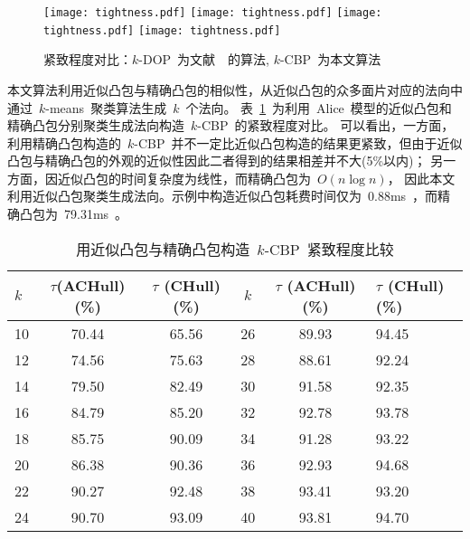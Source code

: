 \begin{figure}[htbp] 
\centering
{}
{
    \texttt{[image: tightness.pdf]}
}
{  
   \texttt{[image: tightness.pdf]}
}
\linebreak
{}
{  
    \texttt{[image: tightness.pdf]}
}
{  
   \texttt{[image: tightness.pdf]}
}
\caption{紧致程度对比：$k$-DOP~为文献~~的算法, $k$-CBP~为本文算法}
\label{chart:exps:tightness}
\end{figure}

本文算法利用近似凸包与精确凸包的相似性，从近似凸包的众多面片对应的法向中通过~$k$-means~聚类算法生成~$k$~个法向。
表~\ref{tab:exp:ach:ch:tightness}~为利用~Alice~模型的近似凸包和精确凸包分别聚类生成法向构造~$k$-CBP~的紧致程度对比。
可以看出，一方面，利用精确凸包构造的~$k$-CBP~并不一定比近似凸包构造的结果更紧致，但由于近似凸包与精确凸包的外观的近似性因此二者得到的结果相差并不大(5\%以内)；
另一方面，因近似凸包的时间复杂度为线性，而精确凸包为~$O(n\log n)$，
因此本文利用近似凸包聚类生成法向。示例中构造近似凸包耗费时间仅为~0.88ms~，而精确凸包为~79.31ms~。

\begin{table}[htbp]   
\centering
\caption{用近似凸包与精确凸包构造~$k$-CBP~紧致程度比较}
\label{tab:exp:ach:ch:tightness}
\begin{tabular}{lccccl}
\toprule[1.5pt]
$k$ &  $\tau$(ACHull)(\%) & $\tau$ (CHull)(\%)  & $k$ &  $\tau$ (ACHull)(\%) & $\tau$ (CHull)(\%) \\
\midrule[1.0pt]
10 &	70.44 & 	65.56     &26 &	89.93 & 	94.45 \\
12 &	74.56 & 	75.63     &28 &	88.61 & 	92.24 \\
14 &	79.50 & 	82.49     &30 &	91.58 & 	92.35 \\
16 &	84.79 & 	85.20     &32 &	92.78 & 	93.78 \\
18 &	85.75 & 	90.09     &34 &	91.28 & 	93.22 \\
20 &	86.38 & 	90.36     &36 &	92.93 & 	94.68 \\
22 &	90.27 & 	92.48     &38 &	93.41 & 	93.20 \\
24 &	90.70 & 	93.09     &40 &	93.81 & 	94.70 \\
\bottomrule[1.5pt]
\end{tabular}
\end{table}


